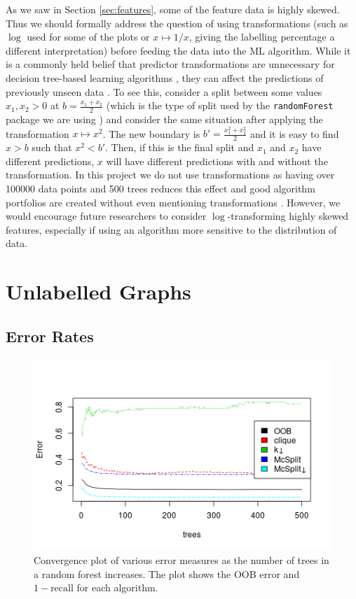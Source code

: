 \documentclass{l4proj}
\theoremstyle{definition}
\theoremstyle{remark}
\begin{document}
As we saw in Section \ref{sec:features}, some of the feature data is highly
skewed. Thus we should formally address the question of using transformations
(such as $\log$ used for some of the plots or $x \mapsto 1/x$, giving
the labelling percentage a different interpretation) before feeding the
data into the ML algorithm. While it is a commonly held belief that
predictor transformations are unnecessary for decision tree-based learning
algorithms \cite{DBLP:journals/classification/Friedman06,
  DBLP:books/lib/HastieTF09, cart}, they can affect the predictions of
previously unseen data \cite{DBLP:journals/corr/GaliliM16}. To see this,
consider a split between some values $x_1, x_2 > 0$ at $b =
\frac{x_1+x_2}{2}$ (which is the type of split used by the
\texttt{randomForest} package we are using
\cite{DBLP:journals/corr/GaliliM16}) and consider the same situation after
applying the transformation $x \mapsto x^2$. The new boundary is $b' =
\frac{x_1^2+x_2^2}{2}$ and it is easy to find $x > b$ such that $x^2 < b'$.
Then, if this is the final split and $x_1$ and $x_2$ have different predictions,
$x$ will have different predictions with and without the transformation. In
this project we do not use transformations as having over \num{100000} data
points and 500 trees reduces this effect and good algorithm portfolios are
created without even mentioning transformations
\cite{DBLP:conf/lion/KotthoffKHT15, DBLP:conf/lion/KotthoffMS16}. However, we
would encourage future researchers to consider $\log$-transforming highly skewed
features, especially if using an algorithm more sensitive to the distribution of
data.

\section{Unlabelled Graphs}

\subsection{Error Rates} \label{sec:unlabelled_error_rates}

\begin{figure}
  \centering
  \includegraphics[scale=0.7]{images/unlabelled_forest_errors.png}
  \caption{Convergence plot of various error measures as the number of trees in
    a random forest increases. The plot shows the OOB error and $1 -
    \text{recall}$ for each algorithm.}
  \label{fig:unlabelled_forest_errors}
\end{figure}
\end{document}
